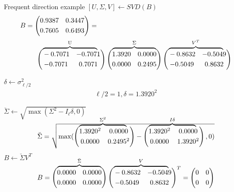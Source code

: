 \documentclass[first=dgreen,second=purple,logo=redque]{aaltoslides}
\newcommand\bovermat[2]{%
  \makebox[0pt][l]{$\smash{\overbrace{\phantom{%
    \begin{matrix}#2\end{matrix}}}^{\text{#1}}}$}#2}
\begin{document}
\begin{frame}[allowframebreaks=1]{Frequent direction example}
\framebreak
 $[U,\Sigma,V] \leftarrow SVD(B)$
\begin{align}
  B = \begin{pmatrix}
       0.9387 & 0.3447 \\[0.3em] 
       0.7605 & 0.6493
     \end{pmatrix} = \hspace{7cm} \nonumber  \\
\nonumber  \\
     \begin{pmatrix}
        \bovermat{U}{-0.7071 & -0.7071} \\[0.3em] 
       -0.7071 & 0.7071
     \end{pmatrix} 
    \begin{pmatrix}
       \bovermat{$\Sigma$}{1.3920 & 0.0000}\\[0.3em] 
       0.0000 & 0.2495
     \end{pmatrix} 
    \begin{pmatrix}
       \bovermat{$V^T$}{-0.8632 & -0.5049} \\[0.3em] 
       -0.5049 & 0.8632
     \end{pmatrix}   \nonumber
\end{align}

$\delta \leftarrow \sigma_{\ell/2}^2$
\begin{align}
   \ell/2 = 1, \delta = 1.3920^2 \nonumber
\end{align}

\framebreak
$\breve{\Sigma} \leftarrow \sqrt{\max(\Sigma^2-I_\ell\delta,0)}$
\begin{align}
 \breve\Sigma=\sqrt{\max(
      \begin{pmatrix}
       \bovermat{$\Sigma^2$}{1.3920^2 & 0.0000}\\[0.3em] 
       0.0000 & 0.2495^2
     \end{pmatrix} - 
      \begin{pmatrix}
       \bovermat{$I\delta$}{1.3920^2 & 0.0000}\\[0.3em] 
       0.0000 & 1.3920^2
     \end{pmatrix},0)} 
   \nonumber
\end{align}
$B\leftarrow \breve{\Sigma}V^T$
\begin{align}
  B = 
    \begin{pmatrix}
       \bovermat{$\breve\Sigma$}{0.0000 & 0.0000}\\[0.3em] 
       0.0000 & 0.0000
     \end{pmatrix}   
    \begin{pmatrix}
       \bovermat{$V$}{-0.8632 & -0.5049} \\[0.3em] 
       -0.5049 & 0.8632
     \end{pmatrix} ^T 
 = \begin{pmatrix}
       0 & 0 \\[0.3em] 
       0 & 0
      \end{pmatrix}  \nonumber 
\end{align}


\end{frame}
\end{document}
